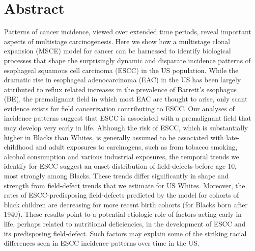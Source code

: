 \documentclass[10pt,letterpaper]{article}
\begin{document}
\section*{Abstract}
Patterns of cancer incidence, viewed over extended time periods, reveal important aspects of multistage carcinogenesis. Here we show how a multistage clonal expansion (MSCE) model for cancer can be harnessed to identify biological processes that shape the surprisingly dynamic and disparate incidence patterns of esophageal squamous cell carcinoma (ESCC) in the US population. While the dramatic rise in esophageal adenocarcinoma (EAC) in the US has been largely attributed to reflux related increases in the prevalence of Barrett’s esophagus (BE), the premalignant field in which most EAC are thought to arise, only scant evidence exists for field cancerization contributing to ESCC. Our analyses of incidence patterns suggest that ESCC is associated with a premalignant field that may develop very early in life. Although the risk of ESCC, which is substantially higher in Blacks than Whites, is generally assumed to be associated with late-childhood and adult exposures to carcinogens, such as from tobacco smoking, alcohol consumption and various industrial exposures, the temporal trends we identify for ESCC suggest an onset distribution of field-defects before age 10, most strongly among Blacks. These trends differ significantly in shape and strength from field-defect trends that we estimate for US Whites. Moreover, the rates of ESCC-predisposing field-defects predicted by the model for cohorts of black children are decreasing for more recent birth cohorts (for Blacks born after 1940). These results point to a potential etiologic role of factors acting early in life, perhaps related to nutritional deficiencies, in the development of ESCC and its predisposing field-defect. Such factors may explain some of the striking racial differences seen in ESCC incidence patterns over time in the US.
\end{document}
